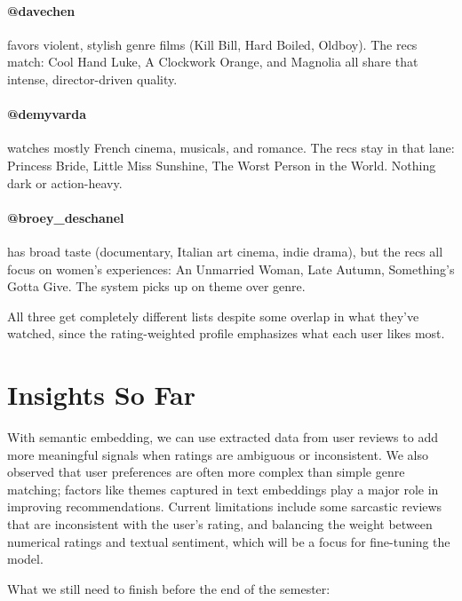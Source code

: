 \documentclass[sigconf,nonacm]{acmart}
\begin{document}
\paragraph{@davechen} favors violent, stylish genre films (Kill Bill, Hard Boiled, Oldboy). The recs match: Cool Hand Luke, A Clockwork Orange, and Magnolia all share that intense, director-driven quality.

\paragraph{@demyvarda} watches mostly French cinema, musicals, and romance. The recs stay in that lane: Princess Bride, Little Miss Sunshine, The Worst Person in the World. Nothing dark or action-heavy.

\paragraph{@broey\_deschanel} has broad taste (documentary, Italian art cinema, indie drama), but the recs all focus on women's experiences: An Unmarried Woman, Late Autumn, Something's Gotta Give. The system picks up on theme over genre.

All three get completely different lists despite some overlap in what they've watched, since the rating-weighted profile emphasizes what each user likes most.

\section{Insights So Far}

With semantic embedding, we can use extracted data from user reviews to add more meaningful signals when ratings are ambiguous or inconsistent. We also observed that user preferences are often more complex than simple genre matching; factors like themes captured in text embeddings play a major role in improving recommendations. Current limitations include some sarcastic reviews that are inconsistent with the user's rating, and balancing the weight between numerical ratings and textual sentiment, which will be a focus for fine-tuning the model.

What we still need to finish before the end of the semester:
\end{document}
